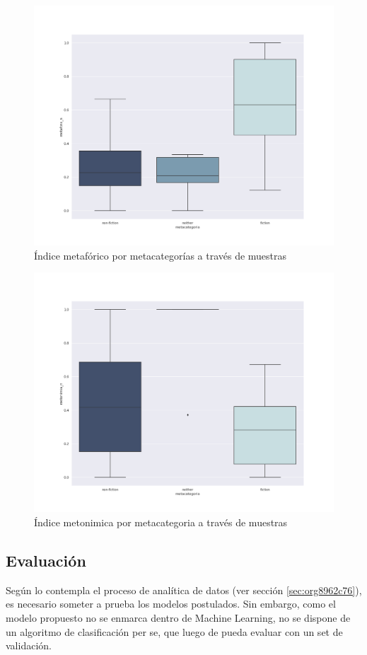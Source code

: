 \documentclass[12pt,letterpaper,twoside]{article}
\begin{document}
\begin{figure}[H]
\centering
\includegraphics[width=0.9\linewidth]{./resultados/graphs/total/metafora_total.png}
\caption{\label{fig:metafora_total} Índice metafórico por metacategorías a través de muestras }
\end{figure}

\begin{figure}[H]
\centering
\includegraphics[width=0.9\linewidth]{./resultados/graphs/total/metonimia_total.png}
\caption{\label{fig:metonimia_total} Índice metonimica por metacategoria a través de muestras }
\end{figure}

\subsection{Evaluación}
\label{sec:orgf2133af}
Según lo contempla el proceso de analítica de datos (ver sección \ref{sec:org8962c76}),
es necesario someter a prueba los modelos postulados. Sin embargo, como el modelo propuesto
no se enmarca dentro de Machine Learning, no se dispone de un algoritmo de clasificación
per se, que luego de pueda evaluar con un set de validación.
\end{document}
